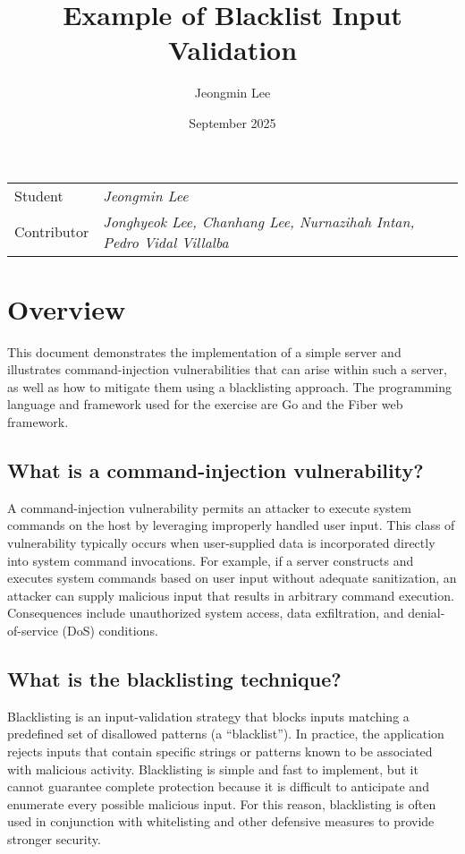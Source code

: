 \documentclass{article}
\title{Example of Blacklist Input Validation}
\author{Jeongmin Lee}
\date{September 2025}
\begin{document}
\maketitle

\noindent\begin{tabular}{@{}ll}
  Student & \textit{Jeongmin Lee}\\
  Contributor & \textit{Jonghyeok Lee, Chanhang Lee, Nurnazihah Intan, Pedro Vidal Villalba}\\
\end{tabular}

\section{Overview}
This document demonstrates the implementation of a simple server and illustrates command-injection vulnerabilities that can arise within such a server, as well as how to mitigate them using a blacklisting approach. The programming language and framework used for the exercise are Go and the Fiber web framework.

\subsection{What is a command-injection vulnerability?}
A command-injection vulnerability permits an attacker to execute system commands on the host by leveraging improperly handled user input. This class of vulnerability typically occurs when user-supplied data is incorporated directly into system command invocations. For example, if a server constructs and executes system commands based on user input without adequate sanitization, an attacker can supply malicious input that results in arbitrary command execution. Consequences include unauthorized system access, data exfiltration, and denial-of-service (DoS) conditions.

\subsection{What is the blacklisting technique?}
Blacklisting is an input-validation strategy that blocks inputs matching a predefined set of disallowed patterns (a “blacklist”). In practice, the application rejects inputs that contain specific strings or patterns known to be associated with malicious activity. Blacklisting is simple and fast to implement, but it cannot guarantee complete protection because it is difficult to anticipate and enumerate every possible malicious input. For this reason, blacklisting is often used in conjunction with whitelisting and other defensive measures to provide stronger security.
\end{document}
